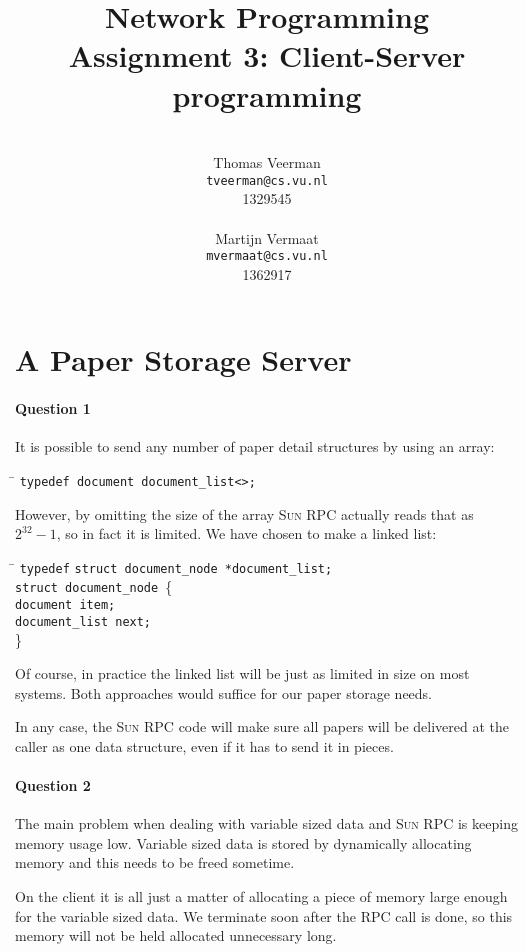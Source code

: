\documentclass[a4paper,10pt]{article}
\title{Network Programming\\
\small{Assignment 3: Client-Server programming}}
\author{%
        \mbox{}\\
        Thomas Veerman\\
        \texttt{tveerman@cs.vu.nl}\\
        1329545\\
        \mbox{}\\
        Martijn Vermaat\\
        \texttt{mvermaat@cs.vu.nl}\\
        1362917
}
\begin{document}
\maketitle

\section{A Paper Storage Server}
\paragraph{Question 1}
It is possible to send any number of paper detail structures by using
an array:

\begin{tabbing}
\hspace{20pt}\=\kill
 \>\texttt{typedef document document\_list<>;}
\end{tabbing}

However, by omitting the size of the array \textsc{Sun RPC} actually reads that
as $2^{32} - 1$, so in fact it is limited. We have chosen to make a
linked list:

\begin{tabbing}
\hspace{20pt}\=\kill
 \> \texttt{type}\=\texttt{def} \texttt{struct document\_node *document\_list;}\\ 
 \> \texttt{struct document\_node }\{ \+ \\
 \> \texttt{document item;}\\ 
 \> \texttt{document\_list next;} \- \\
 \> \} 
\end{tabbing}

Of course, in practice the linked list will be just as limited in size
on most systems. Both approaches would suffice for our paper storage
needs.

In any case, the \textsc{Sun RPC} code will make sure all papers will be
delivered at the caller as one data structure, even if it has to send
it in pieces.


\paragraph{Question 2}
The main problem when dealing with variable sized data and \textsc{Sun RPC} is
keeping memory usage low. Variable sized data is stored by dynamically
allocating memory and this needs to be freed sometime.

On the client it is all just a matter of
allocating a piece of memory large enough for the variable sized
data. We terminate soon after the RPC call is done, so this memory
will not be held allocated unnecessary long.
\end{document}
